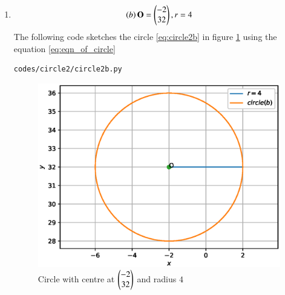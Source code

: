 \begin{enumerate}[label=\thesection.\arabic*.,ref=\thesection.\theenumi]
\item
\begin{align}
\left(b\right)\mathbf{O}=\begin{pmatrix}-2\\32\end{pmatrix},r=4
\label{eq:circle2b}
\end{align}
The following code sketches the circle \ref{eq:circle2b} in figure \ref{fig:circle2b} using the equation \ref{eq:eqn_of_circle}
\begin{lstlisting}
codes/circle2/circle2b.py
\end{lstlisting}
\begin{figure}[!ht]
\centering
\includegraphics[width=\columnwidth]{./codes/circle2/pyfigs/circle2b.eps}
\caption{Circle with centre at $\begin{pmatrix}-2\\32\end{pmatrix}$ and radius $4$}
\label{fig:circle2b}
\end{figure}



\end{enumerate}
